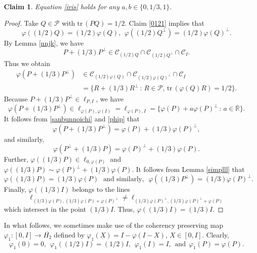 \documentclass[10pt,a4paper]{amsart}
\newcommand\oH{{\overline{H_2}}}
\newcommand\oR{{\overline{\mathbb{R}}}}
\newtheorem{claim}[theorem]{Claim}
\theoremstyle{definition}
\theoremstyle{remark}
\numberwithin{subsection}{section}
\numberwithin{equation}{section}
\begin{document}
\begin{claim}\label{013}
Equation \eqref{iris} holds for any $a, b\in \{0, 1/3, 1\}$. 
\end{claim}
\begin{proof}
Take $Q \in \mathcal{P}$ with $\mathrm{tr}\, (PQ) = 1/2$. 
Claim \ref{0121} implies that 
\[
\varphi ((1/2)Q) = (1/2)\varphi (Q),\ \ \varphi ((1/2)Q^\perp) = (1/2)\varphi (Q)^\perp.
\] 
By Lemma \ref{nnjk}, we have
\[
P + (1/3)P^\perp \in 
\mathcal{C}_{(1/2)Q} \cap \mathcal{C}_{(1/2)Q^\perp} \cap \mathcal{C}_I.
\]
Thus we obtain
\begin{equation}\label{sanbunnoichi}
\begin{split}
\varphi ( P + (1/3) P^\perp) &\in \mathcal{C}_{(1/2)\varphi (Q)} \cap \mathcal{C}_{(1/2)\varphi (Q)^\perp} \cap \mathcal{C}_I\\
&= \{ R + (1/3) R^\perp \, : \, R \in \mathcal{P}, \, \mathrm{tr}\, (\varphi (Q)R) = 1/2 \}.  
\end{split}
\end{equation}
Because $P + (1/3) P^\perp\in \ell_{P, I}$, we have 
\begin{equation}\label{phip}
\varphi ( P + (1/3) P^\perp)\in \ell_{\varphi(P), \varphi(I)}=\ell_{\varphi(P), I}  =
\{ \varphi (P) + a\varphi(P)^\perp   \, : \, a \in  {\oR} \}.
\end{equation}
It follows from \eqref{sanbunnoichi} and \eqref{phip} that
\[
\varphi (P + (1/3) P^\perp ) = \varphi (P) + (1/3) \varphi(P)^\perp,
\]
and similarly,
\[
\varphi (P^\perp + (1/3) P ) = \varphi (P)^\perp + (1/3) \varphi(P) .
\]
Further, $\varphi ((1/3)P)\in \ell_{0, \varphi(P)}$
and $\varphi ((1/3)P)   \sim  \varphi (P)^\perp + (1/3) \varphi(P)$. 
It follows from Lemma \ref{simplll} that 
\[
\varphi ( (1/3) P ) = (1/3) \varphi(P)  \ \ \ \text{and similarly,} \ \ \ \varphi ( (1/3) P^\perp ) = (1/3) \varphi(P)^\perp.
\]
Finally, $\varphi ((1/3)I)$ belongs to the lines 
\[
\ell_{(1/3)\varphi(P), (1/3)\varphi(P) + \varphi (P)^\perp} \not=\ell_{(1/3)\varphi(P)^\perp, (1/3)\varphi(P)^\perp + \varphi (P)}
\]
which intersect in the point $(1/3)I$. Thus,
$\varphi ((1/3)I) = (1/3)I$.
\end{proof}

In what follows, we sometimes make use of the coherency preserving map $\varphi_1 \colon [0,I] \to \oH$ defined by $\varphi_1 (X) = I - \varphi ( I -X)$, $X \in [0, I]$. Clearly, 
\[
\varphi_1 (0) = 0,\ \ \varphi_1 ((1/2)I) = (1/2)I,\ \ \varphi_1 (I) = I,\ \ \text{and}\ \ \varphi_1 (P) = \varphi (P).
\] 
\end{document}
